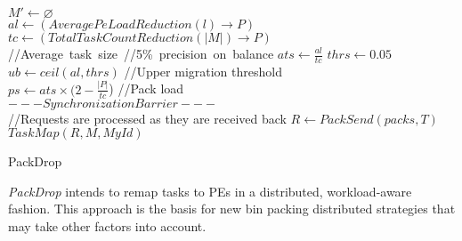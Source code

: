 \begin{algorithm}
	\DontPrintSemicolon
    $  M' \gets \varnothing$\\
    $al \gets (AveragePeLoadReduction(l)\rightarrow  P)$ \\
    $tc \gets (TotalTaskCountReduction(|  M|)\rightarrow  P)$\\
    //Average~task~size~\quad//5\%~precision~on~balance\qquad
    $ats\gets \frac{al}{tc}$ \quad $thrs \gets 0.05$\\
    $ub \gets ceil(al,thrs)$ \qquad //Upper migration threshold\\
    $ps \gets ats\times (2-\frac{|  P|}{tc}$) \qquad\qquad //Pack load\\
    $---Synchronization Barrier---$\\
    //Requests are processed as they are received back
    $R \gets PackSend(packs, T)$\\
    $TaskMap(R,   M, MyId)$
    \caption{PackDrop}
    \label{algo:packdrop}    
\end{algorithm}

\textit{PackDrop} intends to remap tasks to PEs in a distributed, workload-aware fashion.
This approach is the basis for new bin packing distributed strategies that may take other factors into account.

